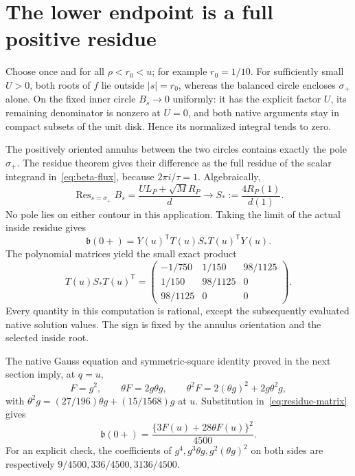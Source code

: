 \documentclass[11pt,a4paper]{article}
\newcommand{\tr}{\mathsf T}
\newcommand{\Res}{\operatorname{Res}}
\begin{document}
\section{The lower endpoint is a full positive residue}
Choose once and for all $\rho<r_0<u$; for example $r_0=1/10$.
For sufficiently small $U>0$, both roots of $f$ lie outside $|s|=r_0$,
whereas the balanced circle encloses $\sigma_+$ alone. On the fixed
inner circle $B_s\to0$ uniformly: it has the explicit factor $U$, its
remaining denominator is nonzero at $U=0$, and both native arguments
stay in compact subsets of the unit disk. Hence its normalized integral
tends to zero.

The positively oriented annulus between the two circles contains exactly
the pole $\sigma_+$. The residue theorem gives their difference as the
full residue of the scalar integrand in~\eqref{eq:beta-flux}, because
$2\pi i/\tau=1$. Algebraically,
\begin{equation}\label{eq:inside-residue}
 \Res_{s=\sigma_+}B_s
 =\frac{U L_P+\sqrt M R_P}{d}
 \longrightarrow S_*:=\frac{4R_P(1)}{d(1)}.
\end{equation}
No pole lies on either contour in this application. Taking the limit of
the actual inside residue gives
\begin{equation}\label{eq:lower-beta}
 \mathfrak b(0+)=Y(u)^{\tr}T(u)S_*T(u)^{\tr}Y(u).
\end{equation}
The polynomial matrices yield the small exact product
\begin{equation}\label{eq:residue-matrix}
 T(u)S_*T(u)^{\tr}=
 \begin{pmatrix}
 -1/750&1/150&98/1125\\
 1/150&98/1125&0\\98/1125&0&0
 \end{pmatrix}.
\end{equation}
Every quantity in this computation is rational, except the subsequently
evaluated native solution values. The sign is fixed by the annulus
orientation and the selected inside root.

The native Gauss equation and symmetric-square identity proved in the
next section imply, at $q=u$,
\[
 F=g^2,\qquad \theta F=2g\theta g,\qquad
 \theta^2 F=2(\theta g)^2+2g\theta^2g,
\]
with
$\theta^2g=(27/196)\theta g+(15/1568)g$ at $u$.
Substitution in~\eqref{eq:residue-matrix} gives
\begin{equation}\label{eq:residue-square}
 \mathfrak b(0+)=\frac{\{3F(u)+28\theta F(u)\}^2}{4500}.
\end{equation}
For an explicit check, the coefficients of $g^4,g^3\theta g,
g^2(\theta g)^2$ on both sides are respectively
$9/4500,336/4500,3136/4500$.
\end{document}
